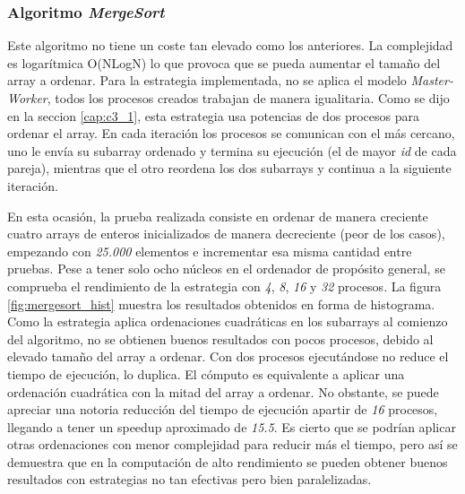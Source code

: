 		
		\subsubsection{Algoritmo \textit{MergeSort}}
		
		Este algoritmo no tiene un coste tan elevado como los anteriores. La complejidad es logarítmica O(NLogN) lo que provoca que se pueda aumentar el tamaño del array a ordenar. Para la estrategia implementada, no se aplica el modelo \textit{Master-Worker}, todos los procesos creados trabajan de manera igualitaria. Como se dijo en la seccion \ref{cap:c3_1}, esta estrategia usa potencias de dos procesos para ordenar el array. En cada iteración los procesos se comunican con el más cercano, uno le envía su subarray ordenado y termina su ejecución (el de mayor \textit{id} de cada pareja), mientras que el otro reordena los dos subarrays y continua a la siguiente iteración.
					
		
		En esta ocasión, la prueba realizada consiste en ordenar de manera creciente cuatro arrays de enteros inicializados de manera decreciente (peor de los casos), empezando con \textit{25.000} elementos e incrementar esa misma cantidad entre pruebas. Pese a tener solo ocho núcleos en el ordenador de propósito general, se comprueba el rendimiento de la estrategia con \textit{4}, \textit{8}, \textit{16} y \textit{32} procesos. La figura \ref{fig:mergesort_hist} muestra los resultados obtenidos en forma de histograma. Como la estrategia aplica ordenaciones cuadráticas en los subarrays al comienzo del algoritmo, no se obtienen buenos resultados con pocos procesos, debido al elevado tamaño del array a ordenar. Con dos procesos ejecutándose no reduce el tiempo de ejecución, lo duplica. El cómputo es equivalente a aplicar una ordenación cuadrática con la mitad del array a ordenar. No obstante, se puede apreciar una notoria reducción del tiempo de ejecución apartir de \textit{16} procesos, llegando a tener un speedup aproximado de \textit{15.5}. Es cierto que se podrían aplicar otras ordenaciones con menor complejidad para reducir más el tiempo, pero así se demuestra que en la computación de alto rendimiento se pueden obtener buenos resultados con estrategias no tan efectivas pero bien paralelizadas.
		
